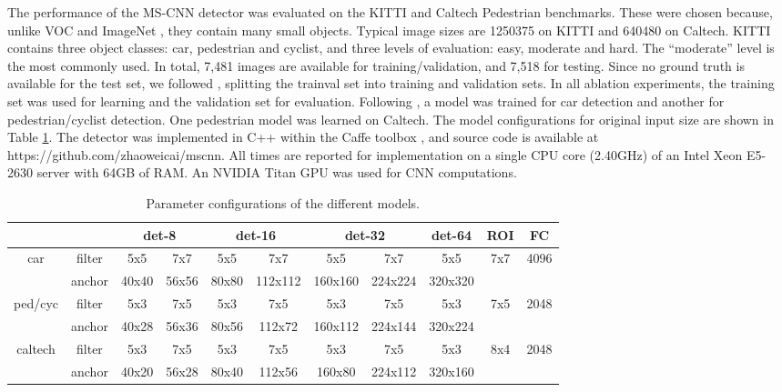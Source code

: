 \documentclass[runningheads]{llncs}
\begin{document}
The performance of the MS-CNN detector was evaluated on the
KITTI \cite{DBLP:conf/cvpr/GeigerLU12}
and Caltech Pedestrian \cite{DBLP:journals/pami/DollarWSP12} benchmarks.
These were chosen because, unlike
VOC \cite{DBLP:journals/ijcv/EveringhamGWWZ10} and ImageNet
\cite{DBLP:journals/ijcv/RussakovskyDSKS15}, they contain many small objects. Typical image sizes are
1250375 on KITTI and 640480 on Caltech.
KITTI contains three object classes: car, pedestrian and cyclist, and three
levels of evaluation: easy, moderate and hard. The ``moderate'' level is the most commonly used. In total, 7,481 images are available for training/validation, and 7,518 for testing.
Since no ground truth is available for the test set, we followed
\cite{DBLP:conf/nips/XiaozhiNIPS15}, splitting the trainval set into training and validation sets. In all ablation experiments, the training set was used for learning and the validation set for evaluation. Following \cite{DBLP:conf/nips/XiaozhiNIPS15}, a model was trained for car detection and another for pedestrian/cyclist detection. One pedestrian model was learned on Caltech. The model configurations for original input size are shown in Table \ref{tab:parameters}. The detector was implemented in C++ within the Caffe toolbox \cite{DBLP:conf/mm/JiaSDKLGGD14}, and source code is available at https://github.com/zhaoweicai/mscnn. All times are reported for implementation on a single CPU core (2.40GHz) of an Intel Xeon E5-2630 server with 64GB of RAM. An NVIDIA Titan GPU was used for CNN computations.

\begin{table}[t]
\centering \scriptsize \setlength{\tabcolsep}{3.0pt}
\vspace{0.1cm} \caption{Parameter configurations of the different models.}
\label{tab:parameters}
\begin{tabular}
{c|c||c|c||c|c||c|c||c||c||c}
\multicolumn{2}{c||}{}
&\multicolumn{2}{|c||}{det-8}
&\multicolumn{2}{|c||}{det-16}
&\multicolumn{2}{|c||}{det-32}
&\multicolumn{1}{|c||}{det-64}
&\multicolumn{1}{|c||}{ROI}
&\multicolumn{1}{|c}{FC}\\\hline\hline
\multirow{2}{*}{car} &filter &5x5 &7x7 &5x5 &7x7 &5x5 &7x7 &5x5 &7x7 &4096\\\cline{2-11}
&anchor &40x40 &56x56 &80x80 &112x112 &160x160 &224x224 &320x320 & &\\\hline
\multirow{2}{*}{ped/cyc} &filter &5x3 &7x5 &5x3 &7x5 &5x3 &7x5 &5x3 &7x5 &2048\\\cline{2-11}
&anchor &40x28 &56x36 &80x56 &112x72 &160x112 &224x144 &320x224 & &\\\hline
\multirow{2}{*}{caltech} &filter &5x3 &7x5 &5x3 &7x5 &5x3 &7x5 &5x3 &8x4 &2048\\\cline{2-11}
&anchor &40x20 &56x28 &80x40 &112x56 &160x80 &224x112 &320x160 & &\\\hline
\end{tabular}
\end{table}
\end{document}
